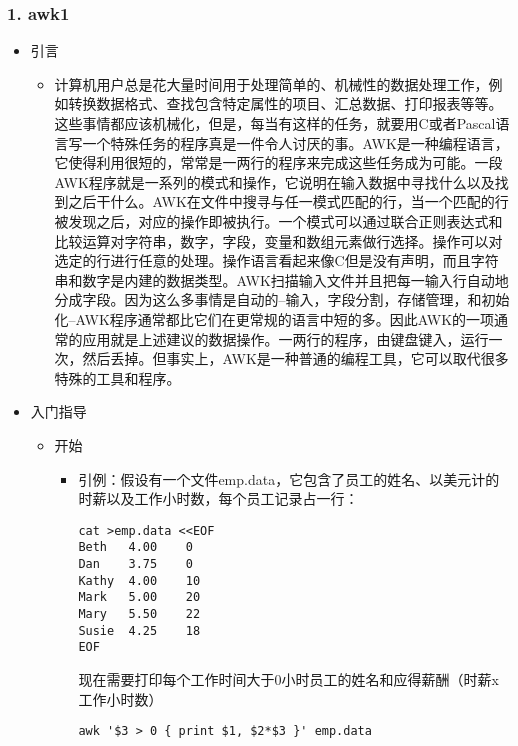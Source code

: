 \documentclass[bigger]{beamer}
\begin{document}
\begin{frame}[fragile]
\frametitle{1. awk1}
\label{sec-5-1}
\begin{itemize}

\item 引言
\label{sec-5-1-1}%
\begin{itemize}

\item 计算机用户总是花大量时间用于处理简单的、机械性的数据处理工作，例如转换数据格式、查找包含特定属性的项目、汇总数据、打印报表等等。这些事情都应该机械化，但是，每当有这样的任务，就要用C或者Pascal语言写一个特殊任务的程序真是一件令人讨厌的事。AWK是一种编程语言，它使得利用很短的，常常是一两行的程序来完成这些任务成为可能。一段AWK程序就是一系列的模式和操作，它说明在输入数据中寻找什么以及找到之后干什么。AWK在文件中搜寻与任一模式匹配的行，当一个匹配的行被发现之后，对应的操作即被执行。一个模式可以通过联合正则表达式和比较运算对字符串，数字，字段，变量和数组元素做行选择。操作可以对选定的行进行任意的处理。操作语言看起来像C但是没有声明，而且字符串和数字是内建的数据类型。AWK扫描输入文件并且把每一输入行自动地分成字段。因为这么多事情是自动的--输入，字段分割，存储管理，和初始化--AWK程序通常都比它们在更常规的语言中短的多。因此AWK的一项通常的应用就是上述建议的数据操作。一两行的程序，由键盘键入，运行一次，然后丢掉。但事实上，AWK是一种普通的编程工具，它可以取代很多特殊的工具和程序。
\label{sec-5-1-1-1}%
\end{itemize} %

\item 入门指导
\label{sec-5-1-2}%
\begin{itemize}

\item 开始
\label{sec-5-1-2-1}%
\begin{itemize}

\item 引例：假设有一个文件emp.data，它包含了员工的姓名、以美元计的时薪以及工作小时数，每个员工记录占一行：\\
\label{sec-5-1-2-1-1}%
\begin{verbatim}
cat >emp.data <<EOF
Beth   4.00    0
Dan    3.75    0
Kathy  4.00    10
Mark   5.00    20
Mary   5.50    22
Susie  4.25    18
EOF
\end{verbatim}

现在需要打印每个工作时间大于0小时员工的姓名和应得薪酬（时薪x工作小时数）

\begin{verbatim}
awk '$3 > 0 { print $1, $2*$3 }' emp.data
\end{verbatim}


\end{itemize}
\end{itemize}
\end{itemize}
\end{frame}
\end{document}
